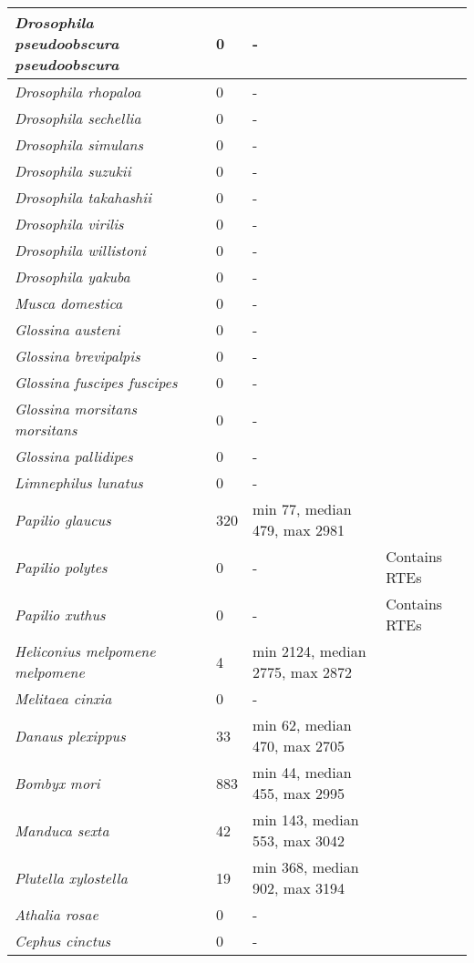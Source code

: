 {\begin{longtable}{| L{4cm} | L{2cm}  | L{5cm} | L{4cm} |}
\textit{Drosophila pseudoobscura pseudoobscura} & 0 & - & \\ \hline
\textit{Drosophila rhopaloa} & 0 & - & \\ \hline
\textit{Drosophila sechellia} & 0 & - & \\ \hline
\textit{Drosophila simulans} & 0 & - & \\ \hline
\textit{Drosophila suzukii} & 0 & - & \\ \hline
\textit{Drosophila takahashii} & 0 & - & \\ \hline
\textit{Drosophila virilis} & 0 & - & \\ \hline
\textit{Drosophila willistoni} & 0 & - & \\ \hline
\textit{Drosophila yakuba} & 0 & - & \\ \hline
\textit{Musca domestica} & 0 & - & \\ \hline
\textit{Glossina austeni} & 0 & - & \\ \hline
\textit{Glossina brevipalpis} & 0 & - & \\ \hline
\textit{Glossina fuscipes fuscipes} & 0 & - & \\ \hline
\textit{Glossina morsitans morsitans} & 0 & - & \\ \hline
\textit{Glossina pallidipes} & 0 & - & \\ \hline
\textit{Limnephilus lunatus} & 0 & - & \\ \hline
\textit{Papilio glaucus} & 320 & min 77, median 479, max 2981 & \\ \hline
\textit{Papilio polytes} & 0 & - & Contains RTEs\\ \hline
\textit{Papilio xuthus} & 0 & - & Contains RTEs \\ \hline
\textit{Heliconius melpomene melpomene} & 4 & min 2124, median 2775, max 2872 & \\ \hline
\textit{Melitaea cinxia} & 0 & - & \\ \hline
\textit{Danaus plexippus} & 33 & min 62, median 470, max 2705 & \\ \hline
\textit{Bombyx mori} & 883 & min 44, median 455, max 2995 & \\ \hline
\textit{Manduca sexta} & 42 & min 143, median 553, max 3042 & \\ \hline
\textit{Plutella xylostella} & 19 & min 368, median 902, max 3194 & \\ \hline
\textit{Athalia rosae} & 0 & - & \\ \hline
\textit{Cephus cinctus} & 0 & - & \\ \hline

\end{longtable}}
